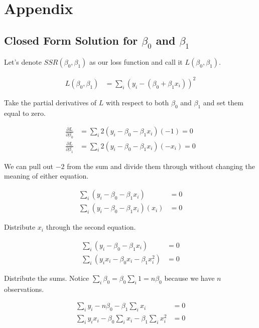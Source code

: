 \section{Appendix}

\subsection{Closed Form Solution for $\beta_0$ and $\beta_1$}

Let's denote $SSR(\beta_0, \beta_1)$ as our loss function and call it $L(\beta_0, \beta_1)$.

\begin{align}
L(\beta_0, \beta_1) &= \sum_i ( y_i -  (\beta_0 + \beta_1 x_i) )^2
\end{align}

Take the partial derivatives of $L$ with respect to both $\beta_0$ and $\beta_1$ and set them equal to zero.

\begin{align}
\frac{\partial L}{\partial \beta_0} &= \sum_i 2( y_i - \beta_0 - \beta_1 x_i )(-1) = 0 \\
\frac{\partial L}{\partial \beta_1} &= \sum_i 2( y_i - \beta_0 - \beta_1 x_i )(-x_i) = 0 
\end{align}

We can pull out $-2$ from the sum and divide them through without changing the meaning of either equation.

\begin{align}
 \sum_i ( y_i - \beta_0 - \beta_1 x_i ) &= 0 \\
 \sum_i ( y_i - \beta_0 - \beta_1 x_i )(x_i) &= 0 
\end{align}

Distribute $x_i$ through the second equation.

\begin{align}
 \sum_i ( y_i - \beta_0 - \beta_1 x_i ) &= 0 \\
 \sum_i ( y_i x_i - \beta_0 x_i - \beta_1 x_i^2 ) &= 0 
\end{align}

Distribute the sums. Notice $\sum_i \beta_0 = \beta_0 \sum_i 1 = n\beta_0$ because we have $n$ observations.

\begin{align}
 \sum_i y_i  - n \beta_0 - \beta_1 \sum_i x_i  &= 0 \\
 \sum_i y_i x_i - \beta_0 \sum_i x_i - \beta_1 \sum_i x_i^2  &= 0 
\end{align}

